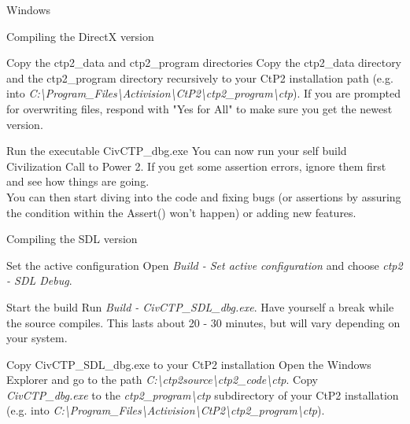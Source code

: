 \begin{section}{Windows}
\begin{subsection}{Compiling the DirectX version}
\begin{subsubsection}{Copy the ctp2\_data and ctp2\_program directories}
Copy the ctp2\_data directory and the ctp2\_program directory recursively to your CtP2 installation path (e.g. into \textit{C:\textbackslash{}Program\_Files\textbackslash{}Activision\textbackslash{}CtP2\textbackslash{}ctp2\_program\textbackslash{}ctp}). If you are prompted for overwriting files, respond with "Yes for All" to make sure you get the newest version.
\end{subsubsection}%

\begin{subsubsection}{Run the executable CivCTP\_dbg.exe}
You can now run your self build Civilization Call to Power 2. If you get some assertion errors, ignore them first and see how things are going.\\
You can then start diving into the code and fixing bugs (or assertions by assuring the condition within the Assert() won't happen) or adding new features.
\end{subsubsection}%

\end{subsection}%

\begin{subsection}{Compiling the SDL version}
\begin{subsubsection}{Set the active configuration}
Open \textit{Build - Set active configuration} and choose \textit{ctp2 - SDL Debug}.
\end{subsubsection}%

\begin{subsubsection}{Start the build}
Run \textit{Build - CivCTP\_SDL\_dbg.exe}. Have yourself a break while the source compiles. This lasts about 20 - 30 minutes, but will vary depending on your system.
\end{subsubsection}%

\begin{subsubsection}{Copy CivCTP\_SDL\_dbg.exe to your CtP2 installation}
Open the Windows Explorer and go to the path \textit{C:\textbackslash{}ctp2source\textbackslash{}ctp2\_code\textbackslash{}ctp}. Copy \textit{CivCTP\_dbg.exe} to the \textit{ctp2\_program\textbackslash{}ctp} subdirectory of your CtP2 installation (e.g. into \textit{C:\textbackslash{}Program\_Files\textbackslash{}Activision\textbackslash{}CtP2\textbackslash{}ctp2\_program\textbackslash{}ctp}).
\end{subsubsection}%


\end{subsection}
\end{section}
